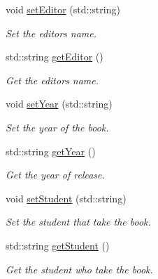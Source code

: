 \begin{DoxyCompactItemize}
void \hyperlink{classBook_a463af516921d49d46b730c455b2de0c3}{set\+Editor} (std\+::string)
\begin{DoxyCompactList}\small\item\em Set the editor\textquotesingle{}s name. \end{DoxyCompactList}\item 
std\+::string \hyperlink{classBook_a8df0e201c23d298f20bc4f36f74ac728}{get\+Editor} ()
\begin{DoxyCompactList}\small\item\em Get the editor\textquotesingle{}s name. \end{DoxyCompactList}\item 
void \hyperlink{classBook_a3383a947b8522adc83e16afecba914be}{set\+Year} (std\+::string)
\begin{DoxyCompactList}\small\item\em Set the year of the book. \end{DoxyCompactList}\item 
std\+::string \hyperlink{classBook_a933b321fec5c6c8bbe39e9d2c0b3de2d}{get\+Year} ()
\begin{DoxyCompactList}\small\item\em Get the year of release. \end{DoxyCompactList}\item 
void \hyperlink{classBook_a92bee3d10d8372e002684c018462dc4c}{set\+Student} (std\+::string)
\begin{DoxyCompactList}\small\item\em Set the student that take the book. \end{DoxyCompactList}\item 
std\+::string \hyperlink{classBook_ae5e61d969f34faf755921a397bdfaf20}{get\+Student} ()
\begin{DoxyCompactList}\small\item\em Get the student who take the book. \end{DoxyCompactList}\end{DoxyCompactItemize}
